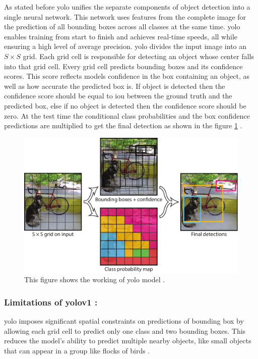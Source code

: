 As stated before \gls{yolo} unifies the separate components of object detection into a single neural network. This network uses features from the complete image for the prediction of all bounding boxes across all classes at the same time. \gls{yolo} enables training from start to finish and achieves real-time speeds, all while ensuring a high level of average precision. \gls{yolo} divides the input image into an $S\times S$ grid. Each grid cell is responsible for detecting an object whose center falls into that grid cell. Every grid cell predicts bounding boxes and its confidence scores. This score reflects models confidence in the box containing an object, as well as how accurate the predicted box is. If object is detected then the confidence score should be equal to \gls{iou} between the ground truth and the predicted box, else if no object is detected then the confidence score should be zero. At the test time the conditional class probabilities and the box confidence predictions are multiplied to get the final detection as shown in the figure \ref{fig:yolo model} \cite{redmon2016you}.

\begin{figure}[H]
    \centering
    \includegraphics[width=1\linewidth]{Rohit_Master_Thesis//Images/yolo_model.pdf}
    \caption{This figure shows the working of \gls{yolo} model \cite{redmon2016you}.}
    \label{fig:yolo model}
\end{figure}

\subsubsection*{Limitations of \gls{yolo}v1 :} 

\gls{yolo} imposes significant spatial constraints on predictions of bounding box by allowing each grid cell to predict only one class and two bounding boxes. This reduces the model's ability to predict multiple nearby objects, like small objects that can appear in a group like flocks of birds \cite{redmon2016you}.

